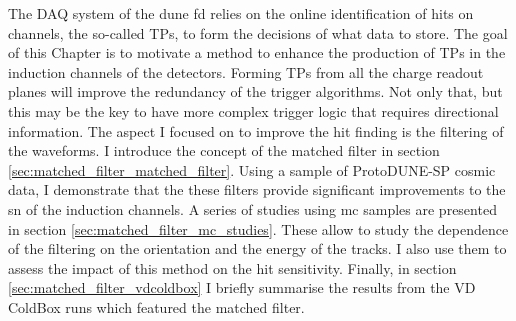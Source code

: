 The DAQ system of the \gls{dune} \gls{fd} relies on the online identification of hits on channels, the so-called TPs, to form the decisions of what data to store. The goal of this Chapter is to motivate a method to enhance the production of TPs in the induction channels of the detectors. Forming TPs from all the charge readout planes will improve the redundancy of the trigger algorithms. Not only that, but this may be the key to have more complex trigger logic that requires directional information. The aspect I focused on to improve the hit finding is the filtering of the waveforms. I introduce the concept of the matched filter in section \ref{sec:matched_filter_matched_filter}. Using a sample of ProtoDUNE-SP cosmic data, I demonstrate that the these filters provide significant improvements to the \gls{sn} of the induction channels. A series of studies using \gls{mc} samples are presented in section \ref{sec:matched_filter_mc_studies}. These allow to study the dependence of the filtering on the orientation and the energy of the tracks. I also use them to assess the impact of this method on the hit sensitivity. Finally, in section \ref{sec:matched_filter_vdcoldbox} I briefly summarise the results from the VD ColdBox runs which featured the matched filter.